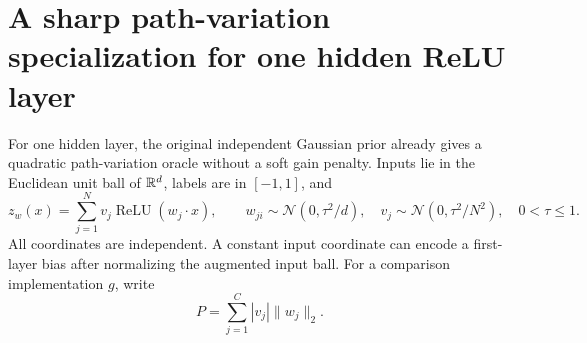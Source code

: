 \section{A sharp path-variation specialization for one hidden ReLU layer}
\label{sec:shallow-ReLU-path}
For one hidden layer, the original independent Gaussian prior already gives a quadratic path-variation oracle without a soft gain penalty. Inputs lie in the Euclidean unit ball of $\mathbb R^d$, labels are in $[-1,1]$, and
\[
 z_w(x)=\sum_{j=1}^N v_j\operatorname{ReLU}(w_j\cdot x),\qquad
 w_{ji}\sim\mathcal N(0,\tau^2/d),\quad
 v_j\sim\mathcal N(0,\tau^2/N^2),\quad0<\tau\le1.
\]
All coordinates are independent. A constant input coordinate can encode a first-layer bias after normalizing the augmented input ball. For a comparison implementation $g$, write
\[
 P=\sum_{j=1}^C|v_j|\|w_j\|_2.
\]

